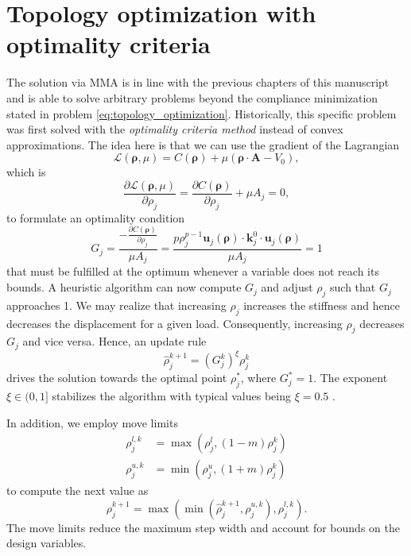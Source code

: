 \section{Topology optimization with optimality criteria}
The solution via MMA is in line with the previous chapters of this manuscript and is able to solve arbitrary problems beyond the compliance minimization stated in problem \eqref{eq:topology_optimization}. Historically, this specific problem was first solved with the \emph{optimality criteria method} instead of convex approximations. The idea here is that we can use the gradient of the Lagrangian
\begin{equation}
    \mathcal{L}(\pmb{\rho}, \mu) = C(\pmb{\rho}) + \mu \left( \pmb{\rho} \cdot \mathbf{A} - V_0 \right),
\end{equation}
which is
\begin{equation}
    \frac{\partial \mathcal{L} (\pmb{\rho}, \mu)}{\partial\rho_j} 
    = \frac{\partial C(\pmb{\rho})}{\partial \rho_j} + \mu A_j = 0,
\end{equation}
to formulate an optimality condition
\begin{equation}
    G_j = \frac{-\frac{\partial C(\pmb{\rho})}{\partial \rho_j}}{\mu A_j} = \frac{p \rho_j^{p-1} \mathbf{u}_j(\pmb{\rho})  \cdot \mathbf{k}^0_j \cdot \mathbf{u}_j(\pmb{\rho})}{\mu A_j} = 1
\end{equation}
that must be fulfilled at the optimum whenever a variable does not reach its bounds.
A heuristic algorithm can now compute $G_j$ and adjust $\rho_j$ such that $G_j$ approaches 1. We may realize that increasing $\rho_j$ increases the stiffness and hence decreases the displacement for a given load. Consequently, increasing $\rho_j$ decreases $G_j$ and vice versa. Hence, an update rule 
\begin{equation}
    \hat{\rho}_j^{k+1} = \left(G_j^k\right)^\xi \rho_j^k 
\end{equation}
drives the solution towards the optimal point $\rho_j^*$, where $G^*_j=1$. The exponent $\xi \in (0,1]$ stabilizes the algorithm with typical values being $\xi=0.5$ \cite{Harzheim2014}. 

In addition, we employ move limits 
\begin{align}
    \rho_j^{l,k} &= \max \left(\rho_j^l, (1-m)\rho_j^k \right) \\
    \rho_j^{u,k} &= \min \left(\rho_j^u, (1+m)\rho_j^k \right)
\end{align}
to compute the next value as 
\begin{equation}
    \rho_j^{k+1} = \max \left( \min \left(\hat{\rho}_j^{k+1}, \rho_j^{u,k} \right), \rho_j^{l,k} \right).
\end{equation}
The move limits reduce the maximum step width and account for bounds on the design variables. 

